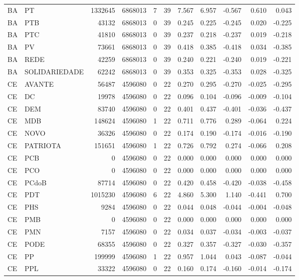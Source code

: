 \begin{landscape}
\begin{longtable}{llrrrrrrrrr}
BA & PT & 1332645 & 6868013 & 7 & 39 & 7.567 & 6.957 & -0.567 & 0.610 & 0.043 \\
BA & PTB & 43132 & 6868013 & 0 & 39 & 0.245 & 0.225 & -0.245 & 0.020 & -0.225 \\
BA & PTC & 41810 & 6868013 & 0 & 39 & 0.237 & 0.218 & -0.237 & 0.019 & -0.218 \\
BA & PV & 73661 & 6868013 & 0 & 39 & 0.418 & 0.385 & -0.418 & 0.034 & -0.385 \\
BA & REDE & 42259 & 6868013 & 0 & 39 & 0.240 & 0.221 & -0.240 & 0.019 & -0.221 \\
BA & SOLIDARIEDADE & 62242 & 6868013 & 0 & 39 & 0.353 & 0.325 & -0.353 & 0.028 & -0.325 \\
CE & AVANTE & 56487 & 4596080 & 0 & 22 & 0.270 & 0.295 & -0.270 & -0.025 & -0.295 \\
CE & DC & 19978 & 4596080 & 0 & 22 & 0.096 & 0.104 & -0.096 & -0.009 & -0.104 \\
CE & DEM & 83740 & 4596080 & 0 & 22 & 0.401 & 0.437 & -0.401 & -0.036 & -0.437 \\
CE & MDB & 148624 & 4596080 & 1 & 22 & 0.711 & 0.776 & 0.289 & -0.064 & 0.224 \\
CE & NOVO & 36326 & 4596080 & 0 & 22 & 0.174 & 0.190 & -0.174 & -0.016 & -0.190 \\
CE & PATRIOTA & 151651 & 4596080 & 1 & 22 & 0.726 & 0.792 & 0.274 & -0.066 & 0.208 \\
CE & PCB & 0 & 4596080 & 0 & 22 & 0.000 & 0.000 & 0.000 & 0.000 & 0.000 \\
CE & PCO & 0 & 4596080 & 0 & 22 & 0.000 & 0.000 & 0.000 & 0.000 & 0.000 \\
CE & PCdoB & 87714 & 4596080 & 0 & 22 & 0.420 & 0.458 & -0.420 & -0.038 & -0.458 \\
CE & PDT & 1015230 & 4596080 & 6 & 22 & 4.860 & 5.300 & 1.140 & -0.441 & 0.700 \\
CE & PHS & 9284 & 4596080 & 0 & 22 & 0.044 & 0.048 & -0.044 & -0.004 & -0.048 \\
CE & PMB & 0 & 4596080 & 0 & 22 & 0.000 & 0.000 & 0.000 & 0.000 & 0.000 \\
CE & PMN & 7157 & 4596080 & 0 & 22 & 0.034 & 0.037 & -0.034 & -0.003 & -0.037 \\
CE & PODE & 68355 & 4596080 & 0 & 22 & 0.327 & 0.357 & -0.327 & -0.030 & -0.357 \\
CE & PP & 199999 & 4596080 & 1 & 22 & 0.957 & 1.044 & 0.043 & -0.087 & -0.044 \\
CE & PPL & 33322 & 4596080 & 0 & 22 & 0.160 & 0.174 & -0.160 & -0.014 & -0.174 \\

\end{longtable}
\end{landscape}
